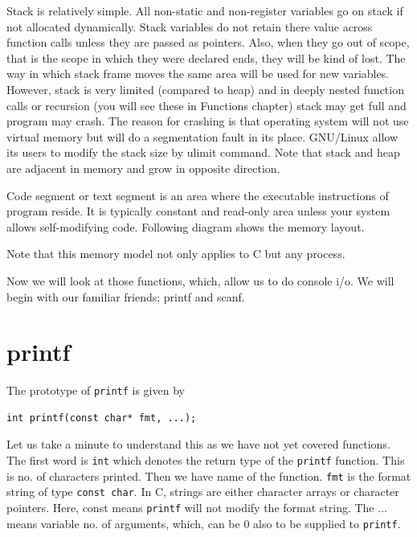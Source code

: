 Stack is relatively simple. All non-static and non-register variables go on
stack if not allocated dynamically. Stack variables do not retain there value
across function calls unless
they are passed as pointers. Also, when they go out of
scope, that is the scope in which they were declared ends, they will be kind of
lost. The way in which stack frame moves the same area will be used for new
variables. However, stack is very limited (compared to heap) and in deeply
nested function calls or recursion (you will see these in Functions chapter)
stack may get full and program may crash. The reason for crashing is that
operating system will not use virtual memory but will do a segmentation fault
in its place. GNU/Linux allow its users to modify the stack size by ulimit
command. Note that stack and heap are adjacent in memory and grow in opposite
direction.

Code segment or text segment is an area where the executable instructions of
program reside. It is typically constant and read-only area unless your system
allows self-modifying code. Following diagram shows the memory layout.

Note that this memory model not only applies to C but any process.

Now we will look at those functions, which, allow us to do console i/o. We will
begin with our familiar friends; printf and scanf.

\section{printf}
The prototype of \texttt{printf} is given by

\begin{Verbatim}[frame=single]
int printf(const char* fmt, ...);
\end{Verbatim}

Let us take a minute to understand this as we have not yet covered
functions. The first word is \texttt{int} which denotes the return type of the
\texttt{printf} function. This is no. of characters printed. Then we have name
of the function. \texttt{fmt} is the format string of type \texttt{const
 char}. In C, strings are either character arrays or character pointers. Here,
const means \texttt{printf} will not modify the format string. The ... means
variable no. of arguments, which, can be 0 also to be supplied to
\texttt{printf}.

